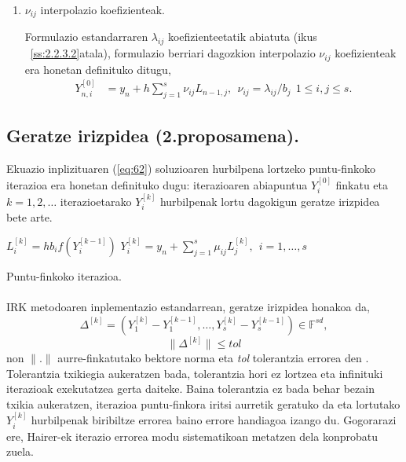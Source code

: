 \begin{enumerate}
\item $\nu_{ij}$ interpolazio koefizienteak.

Formulazio estandarraren $\lambda_{ij}$ koefizienteetatik abiatuta (ikus ~\ref{ss:2.2.3.2}atala), formulazio berriari dagozkion interpolazio $\nu_{ij}$ koefizienteak era honetan definituko ditugu,
\begin{align}
\label{eq: interpLi}
Y_{n,i}^{[0]} &= y_n+ h \sum\limits_{j=1}^{s} \nu_{ij} L_{n-1,j}, \ \ \nu_{ij}=\lambda_{ij}/b_j \ \ 1\leqslant i,j \leqslant s.
\end{align} 

\end{enumerate}

\subsection{Geratze irizpidea (2.proposamena).}

Ekuazio inplizituaren (\ref{eq:62}) soluzioaren hurbilpena lortzeko puntu-finkoko iterazioa era honetan definituko dugu: iterazioaren abiapuntua $Y_i^{[0]}$  finkatu eta $k=1,2,\dots$ iterazioetarako $Y_i^{[k]}$ hurbilpenak lortu dagokigun geratze irizpidea bete arte.

\begin{algorithm}[H]
  {
   $L_i^{[k]}=hb_if(Y_i^{[k-1]}) $\;
   $Y_i^{[k]}=y_n+\sum\limits_{j=1}^{s} \mu_{ij} L_j^{[k]} , \ \  i=1,\dots,s $\; 
   }
 \caption{Puntu-finkoko iterazioa.}
 \label{alg:pf}
\end{algorithm}
 
\paragraph*{}IRK metodoaren inplementazio estandarrean, geratze irizpidea honakoa da,
\begin{equation*}
\Delta^{[k]}=(Y_1^{[k]}-Y_1^{[k-1]},\dots,Y_s^{[k]}-Y_s^{[k-1]}) \in \mathbb{F}^{sd},
\end{equation*} 
\begin{equation}
\|\Delta^{[k]}\| \le tol
\end{equation}
non $\|.\|$ aurre-finkatutako bektore norma eta \emph{tol} tolerantzia errorea den . Tolerantzia txikiegia aukeratzen bada, tolerantzia hori ez lortzea eta infinituki iterazioak exekutatzea gerta daiteke. Baina tolerantzia ez bada behar bezain txikia  aukeratzen, iterazioa puntu-finkora iritsi aurretik geratuko da eta lortutako $Y_i^{[k]}$ hurbilpenak biribiltze errorea baino errore handiagoa izango du. Gogorarazi ere, Hairer-ek \cite{Hairer2008} iterazio errorea modu sistematikoan metatzen dela konprobatu zuela.   

